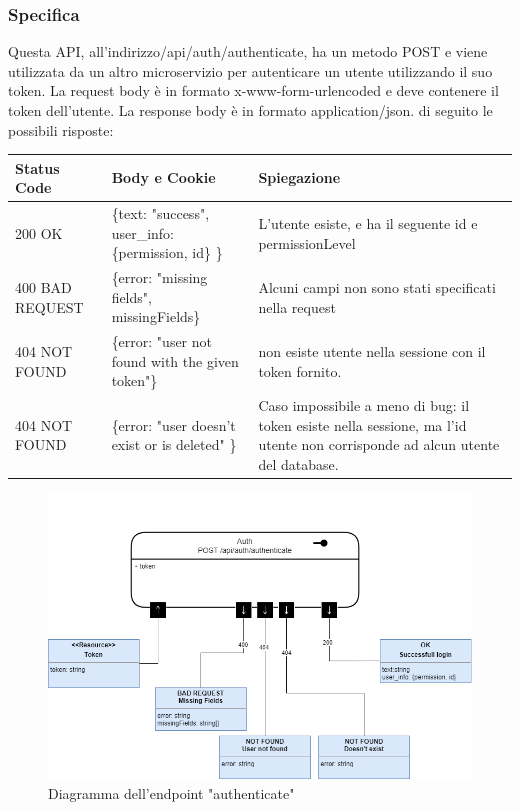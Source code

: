 \documentclass{report}
\begin{document}
\subsubsection*{Specifica}
Questa API, all'indirizzo/api/auth/authenticate, ha un metodo POST e viene utilizzata da un altro microservizio per autenticare un utente utilizzando il suo token.
La request body è in formato x-www-form-urlencoded e deve contenere il token dell'utente.
La response body è in formato application/json. di seguito le possibili risposte:
\begin{center} %
	\centering
	\begin{tabular}{ |p{4cm}|p{5cm}|p{4cm}| }
		\hline
		\centering Status Code & \qquad\quad Body e Cookie                            & \qquad\qquad Spiegazione                                                                                                     \\ %
		\hline
		200 OK                 & \{text: "success", user\_info: \{permission, id\} \} & L'utente esiste, e ha il seguente id e permissionLevel                                                                       \\
		\hline
		400 BAD REQUEST        & \{error: "missing fields", missingFields\}           & Alcuni campi non sono stati specificati nella request                                                                        \\ %
		\hline
		404 NOT FOUND          & \{error: "user not found with the given token"\}     & non esiste utente nella sessione con il token fornito.                                                                       \\%
		\hline
		404 NOT FOUND          & \{error: "user doesn't exist or is deleted" \}       & Caso impossibile a meno di bug: il token esiste nella sessione, ma l'id utente non corrisponde ad alcun utente del database. \\
		\hline
	\end{tabular}
\end{center}
\begin{figure}[H]
	\centering\includegraphics[width=1\textwidth]{images/microservizio-autenticazione/diagrams/diagramma_auth.drawio.png}
	\caption{Diagramma dell'endpoint "authenticate"}
\end{figure}
\end{document}
